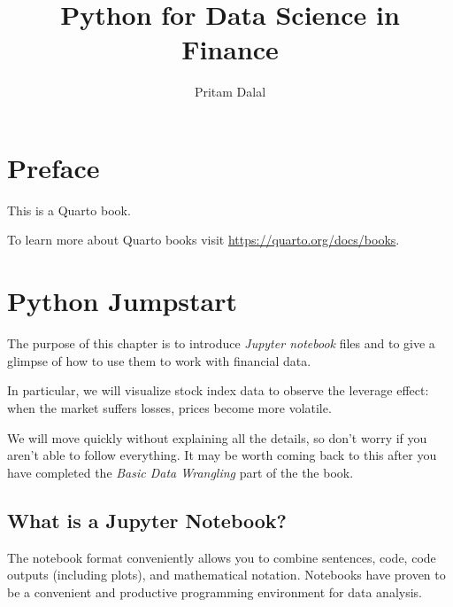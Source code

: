 \documentclass[
  letterpaper,
  DIV=11,
  numbers=noendperiod]{scrreprt}
\title{Python for Data Science in Finance}
\author{Pritam Dalal}
\date{}
\renewcommand*\contentsname{Table of contents}
\newcommand\contentsname{Table of contents}
\begin{document}
\maketitle
\ifdefined\Shaded\renewenvironment{Shaded}{\begin{tcolorbox}[frame hidden, sharp corners, borderline west={3pt}{0pt}{shadecolor}, interior hidden, enhanced, boxrule=0pt, breakable]}{\end{tcolorbox}}\fi

\renewcommand*\contentsname{Table of contents}
{
\hypersetup{linkcolor=}
\setcounter{tocdepth}{2}
\tableofcontents
}

\hypertarget{preface}{%
\chapter*{Preface}\label{preface}}


This is a Quarto book.

To learn more about Quarto books visit
\url{https://quarto.org/docs/books}.


\hypertarget{python-jumpstart}{%
\chapter{Python Jumpstart}\label{python-jumpstart}}

The purpose of this chapter is to introduce \emph{Jupyter notebook}
files and to give a glimpse of how to use them to work with financial
data.

In particular, we will visualize stock index data to observe the
leverage effect: when the market suffers losses, prices become more
volatile.

We will move quickly without explaining all the details, so don't worry
if you aren't able to follow everything. It may be worth coming back to
this after you have completed the \emph{Basic Data Wrangling} part of
the the book.

\hypertarget{what-is-a-jupyter-notebook}{%
\section{What is a Jupyter Notebook?}\label{what-is-a-jupyter-notebook}}

The notebook format conveniently allows you to combine sentences, code,
code outputs (including plots), and mathematical notation. Notebooks
have proven to be a convenient and productive programming environment
for data analysis.
\end{document}
